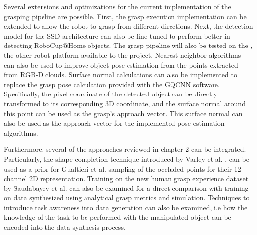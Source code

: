 Several extensions and optimizations for the current implementation of the grasping pipeline are possible. First, the
grasp execution implementation can be extended to allow the robot to grasp from different directions. Next, the
detection model for the SSD architecture can also be fine-tuned to perform better in detecting RoboCup@Home objects.
The grasp pipeline will also be tested on the , the other robot platform available to the project. Nearest neighbor algorithms can also be used to
improve object pose estimation from the points extracted from RGB-D clouds. Surface normal calculations can also be
implemented to replace the grasp pose calculation provided with the GQCNN software. Specifically, the pixel coordinate
of the detected object can be directly transformed to its corresponding 3D coordinate, and the surface normal around
this point can be used as the grasp's approach vector. This surface normal can also be used as the approach vector for
the implemented pose estimation algorithms.

Furthermore, several of the approaches reviewed in chapter 2 can be integrated. Particularly, the shape completion
technique introduced by Varley et al. \cite{Varley2017}, can be used as a prior for Gualtieri et al.
\cite{Gualtieri2016} sampling of the occluded points for their 12-channel 2D representation. Training on the new human
grasp experience dataset by Saudabayev et al. \cite{Saudabayev2018} can also be examined for a direct comparison with
training on data synthesized using analytical grasp metrics and simulation. Techniques to introduce task awareness into
data generation can also be examined, i.e how the knowledge of the task to be performed with the manipulated object can
be encoded into the data synthesis process.
